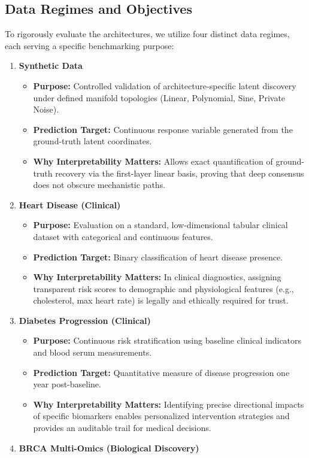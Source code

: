 \documentclass[
  letterpaper,
]{report}
\providecommand{\tightlist}{%
  \setlength{\itemsep}{0pt}\setlength{\parskip}{0pt}}
\begin{document}
\subsection{Data Regimes and
Objectives}\label{data-regimes-and-objectives}

To rigorously evaluate the architectures, we utilize four distinct data
regimes, each serving a specific benchmarking purpose:

\begin{enumerate}
\def\labelenumi{\arabic{enumi}.}
\tightlist
\item
  \textbf{Synthetic Data}

  \begin{itemize}
  \tightlist
  \item
    \textbf{Purpose:} Controlled validation of architecture-specific
    latent discovery under defined manifold topologies (Linear,
    Polynomial, Sine, Private Noise).
  \item
    \textbf{Prediction Target:} Continuous response variable generated
    from the ground-truth latent coordinates.
  \item
    \textbf{Why Interpretability Matters:} Allows exact quantification
    of ground-truth recovery via the first-layer linear basis, proving
    that deep consensus does not obscure mechanistic paths.
  \end{itemize}
\item
  \textbf{Heart Disease (Clinical)}

  \begin{itemize}
  \tightlist
  \item
    \textbf{Purpose:} Evaluation on a standard, low-dimensional tabular
    clinical dataset with categorical and continuous features.
  \item
    \textbf{Prediction Target:} Binary classification of heart disease
    presence.
  \item
    \textbf{Why Interpretability Matters:} In clinical diagnostics,
    assigning transparent risk scores to demographic and physiological
    features (e.g., cholesterol, max heart rate) is legally and
    ethically required for trust.
  \end{itemize}
\item
  \textbf{Diabetes Progression (Clinical)}

  \begin{itemize}
  \tightlist
  \item
    \textbf{Purpose:} Continuous risk stratification using baseline
    clinical indicators and blood serum measurements.
  \item
    \textbf{Prediction Target:} Quantitative measure of disease
    progression one year post-baseline.
  \item
    \textbf{Why Interpretability Matters:} Identifying precise
    directional impacts of specific biomarkers enables personalized
    intervention strategies and provides an auditable trail for medical
    decisions.
  \end{itemize}
\item
  \textbf{BRCA Multi-Omics (Biological Discovery)}


\end{enumerate}
\end{document}
